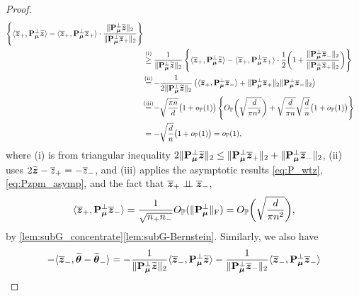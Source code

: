 \begin{proof}
\begin{equation}
\begin{aligned}
        \left\{  \< \bar\zz_+, \bP_{\vmu}^\perp \wt\zz \>  -  \< \bar\zz_+, \bP_{\vmu}^\perp \bar\zz_+ \> \cdot \frac{\| \bP_{\vmu}^\perp \wt\zz \|_2}{\| \bP_{\vmu}^\perp \bar\zz_+ \|_2} \right\}
        \\
        & \overset{\mathmakebox[0pt][c]{\text{(i)}}}{\ge}
        \frac{1}{\| \bP_{\vmu}^\perp \wt\zz \|_2} 
        \left\{  \< \bar\zz_+, \bP_{\vmu}^\perp \wt\zz \> 
        - \< \bar\zz_+, \bP_{\vmu}^\perp \bar\zz_+ \> \cdot 
        \frac12 \biggl( 1 +  \frac{\| \bP_{\vmu}^\perp \bar\zz_- \|_2}{\| \bP_{\vmu}^\perp \bar\zz_+ \|_2} \biggr) 
        \right\} \\
        & \overset{\mathmakebox[0pt][c]{\text{(ii)}}}{=} - \frac{1}{2\| \bP_{\vmu}^\perp \wt\zz \|_2} \left( 
            \< \bar\zz_+, \bP_{\vmu}^\perp \bar\zz_-  \> + \| \bP_{\vmu}^\perp \bar\zz_+ \|_2 \| \bP_{\vmu}^\perp \bar\zz_- \|_2
         \right) \\
        & \overset{\mathmakebox[0pt][c]{\text{(iii)}}}{=}
         - \sqrt{\frac{\pi n}{d}}\big(1 + o_\P(1) \big) \left\{ 
            O_\P\biggl(  \sqrt{\frac{d}{\pi n^2}} \biggr) + \sqrt{\frac{d}{\pi n}}\sqrt{\frac{d}{n}} \big(1 + o_\P(1) \big)
         \right\} \\
        & = - \sqrt{\frac{d}{n}}\big(1 + o_\P(1) \big)
        = o_\P(1),
    \end{aligned}
\end{equation}
where (i) is from triangular inequality $2\| \mathrm{\bf P}_{{\boldsymbol{\mu}}}^\perp \widetilde{\text{\boldmath $z$}} \|_2 \le \| \mathrm{\bf P}_{{\boldsymbol{\mu}}}^\perp \overline{\text{\boldmath $z$}}_+ \|_2 + \| \mathrm{\bf P}_{{\boldsymbol{\mu}}}^\perp \overline{\text{\boldmath $z$}}_- \|_2$, (ii) uses $2 \widetilde{\text{\boldmath $z$}} - \overline z_+ = -\overline z_-$, and (iii) applies the asymptotic results \cref{eq:P_wtz}, \eqref{eq:Pzpm_asymp}, and the fact that $\overline{\text{\boldmath $z$}}_+ \perp\!\!\!\perp \overline{\text{\boldmath $z$}}_-$, 
\begin{equation*}
    \langle \overline{\text{\boldmath $z$}}_{+}, \mathrm{\bf P}_{{\boldsymbol{\mu}}}^\perp \overline{\text{\boldmath $z$}}_{-} \rangle = \frac{1}{\sqrt{n_+ n_-}} O_{\mathbb{P}}(\| \mathrm{\bf P}_{{\boldsymbol{\mu}}}^\perp \|_\mathrm{F}) = O_{\mathbb{P}}\biggl( \sqrt{\frac{d}{\pi n^2}}  \biggr),
\end{equation*}
by \cref{lem:subG_concentrate}\ref{lem:subG-Bernstein}. Similarly, we also have
\begin{equation}\label{eq:zV_diff_2-}
    \begin{aligned}
        - \< \bar\zz_-, \wt\vtheta - \wt\vtheta_- \>
        & =
        - \frac{1}{\| \bP_{\vmu}^\perp \wt\zz \|_2} \< \bar\zz_-, \bP_{\vmu}^\perp \wt\zz \> 
        - \frac{1}{\| \bP_{\vmu}^\perp \bar\zz_- \|_2} \< \bar\zz_-, \bP_{\vmu}^\perp \bar\zz_- \> \\

\end{aligned}
\end{equation}
\end{proof}
